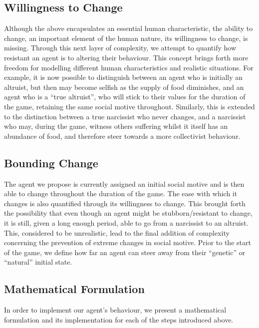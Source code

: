 \subsection{Willingness to Change}
Although the above encapsulates an essential human characteristic, the ability to change, an important element of the human nature, its willingness to change, is missing. Through this next layer of complexity, we attempt to quantify how resistant an agent is to altering their behaviour. This concept brings forth more freedom for modelling different human characteristics and realistic situations. For example, it is now possible to distinguish between an agent who is initially an altruist, but then may become selfish as the supply of food diminishes, and an agent who is a “true altruist”, who will stick to their values for the duration of the game, retaining the same social motive throughout. Similarly, this is extended to the distinction between a true narcissist who never changes, and a narcissist who may, during the game, witness others suffering whilst it itself has an abundance of food, and therefore steer towards a more collectivist behaviour. %

\subsection{Bounding Change}
The agent we propose is currently assigned an initial social motive and is then able to change throughout the duration of the game. The ease with which it changes is also quantified through its willingness to change. This brought forth the possibility that even though an agent might be stubborn/resistant to change, it is still, given a long enough period, able to go from a narcissist to an altruist. This, considered to be unrealistic, lead to the final addition of complexity concerning the prevention of extreme changes in social motive. Prior to the start of the game, we define how far an agent can steer away from their “genetic” or “natural” initial state.

\subsection{Mathematical Formulation}\label{mathematical_formulation}
In order to implement our agent's behaviour, we present a mathematical formulation and its implementation for each of the steps introduced above.

